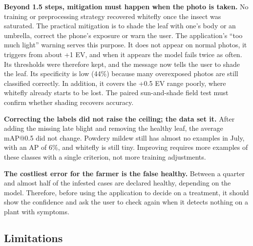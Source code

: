 \documentclass[sensors,article,submit,pdftex,moreauthors]{Definitions/mdpi}
\begin{document}
{\color{blue} \textbf{Beyond 1.5 steps, mitigation must happen when the photo is taken.} No training or preprocessing strategy recovered whitefly once the insect was saturated.} {\color{blue} The practical mitigation is to shade the leaf with one's body or an umbrella, correct the phone's exposure or warn the user.} {\color{blue} The application's ``too much light'' warning serves this purpose.} {\color{blue} It does not appear on normal photos, it triggers from about +1 EV, and when it appears the model fails twice as often.} {\color{blue} Its thresholds were therefore kept, and the message now tells the user to shade the leaf.} {\color{blue} Its specificity is low (44\%) because many overexposed photos are still classified correctly.} {\color{blue} In addition, it covers the +0.5 EV range poorly, where whitefly already starts to be lost.} {\color{blue} The paired sun-and-shade field test must confirm whether shading recovers accuracy.}

{\color{blue} \textbf{Correcting the labels did not raise the ceiling; the data set it.} After adding the missing late blight and removing the healthy leaf, the average mAP@0.5 did not change.} {\color{blue} Powdery mildew still has almost no examples in July, with an AP of 6\%, and whitefly is still tiny.} {\color{blue} Improving requires more examples of these classes with a single criterion, not more training adjustments.}

{\color{blue} \textbf{The costliest error for the farmer is the false healthy.} Between a quarter and almost half of the infested cases are declared healthy, depending on the model.} {\color{blue} Therefore, before using the application to decide on a treatment, it should show the confidence and ask the user to check again when it detects nothing on a plant with symptoms.}

\subsection{\color{blue} Limitations}\label{sec:limitaciones}
\end{document}
